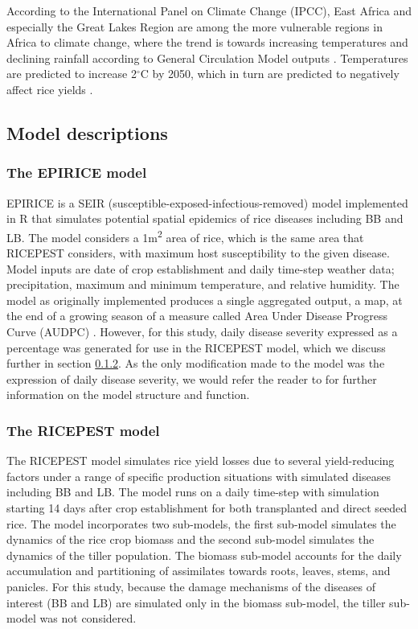 \documentclass[preprint,review,12pt]{elsarticle}
\begin{document}
    According to the International Panel on Climate Change (IPCC), East Africa and especially the Great Lakes Region are among the more vulnerable regions in Africa to climate change, where the trend is towards increasing temperatures and declining rainfall according to General Circulation Model outputs \cite{Boko2007}. Temperatures are predicted to increase 2$^{\circ}$C by 2050, which in turn are predicted to negatively affect rice yields \cite{Rowhani2011}.
    
    \subsection{Model descriptions}
    \subsubsection{The EPIRICE model} \label{EPIRICE}
    EPIRICE \cite{Savary2012} is a SEIR (susceptible-exposed-infectious-removed) model \cite{Kermack1927, Madden2006} implemented in R \cite{R2014} that simulates potential spatial epidemics of rice diseases including BB and LB. The model considers a 1m\textsuperscript{2} area of rice, which is the same area that RICEPEST considers, with maximum host susceptibility to the given disease. Model inputs are date of crop establishment and daily time-step weather data; precipitation, maximum and minimum temperature, and relative humidity. The model as originally implemented produces a single aggregated output, a map, at the end of a growing season of a measure called Area Under Disease Progress Curve (AUDPC) \cite{Madden2007}. However, for this study, daily disease severity expressed as a percentage was generated for use in the RICEPEST model, which we discuss further in section \ref{RICEPEST}. As the only modification made to the model was the expression of daily disease severity, we  would refer the reader to \citet{Savary2012} for further information on the model structure and function.
    
    \subsubsection{The RICEPEST model}\label{RICEPEST}
    The RICEPEST model \cite{Willocquet2000, Willocquet2002} simulates rice yield losses due to several yield-reducing factors under a range of specific production situations with simulated diseases including BB and LB. The model runs on a daily time-step with simulation starting 14 days after crop establishment for both transplanted and direct seeded rice. The model incorporates two sub-models, the first sub-model simulates the dynamics of the rice crop biomass and the second sub-model simulates the dynamics of the tiller population. The biomass sub-model accounts for the daily accumulation and partitioning of assimilates towards roots, leaves, stems, and panicles. For this study, because the damage mechanisms of the diseases of interest (BB and LB) are simulated only in the biomass sub-model, the tiller sub-model was not considered.
    
\end{document}
